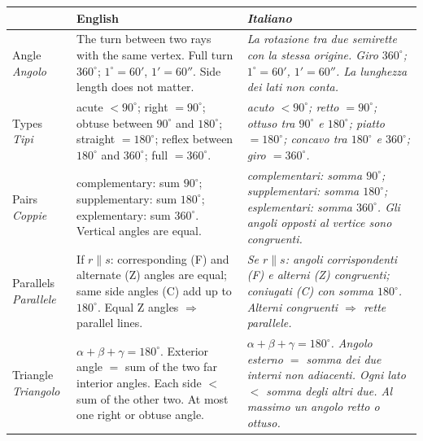 \label{app:summary}

{\small
\renewcommand{\arraystretch}{1.28}
\begin{tabularx}{\textwidth}{@{}>{\bfseries\color{navy}\raggedright\arraybackslash}p{2.1cm} >{\raggedright\arraybackslash}X >{\raggedright\arraybackslash\itshape\leavevmode\color{itgreen}}X@{}}
\toprule
\rowcolor{white}
& \textbf{English} & \textbf{\upshape Italiano}\\
\midrule
Angle \newline \textit{Angolo} &
The turn between two rays with the same vertex. Full turn $360^\circ$; $1^\circ = 60'$, $1' = 60''$. Side length does not matter. &
La rotazione tra due semirette con la stessa origine. Giro $360^\circ$; $1^\circ = 60'$, $1' = 60''$. La lunghezza dei lati non conta.\\
Types \newline \textit{Tipi} &
acute $<90^\circ$; right $=90^\circ$; obtuse between $90^\circ$ and $180^\circ$; straight $=180^\circ$; reflex between $180^\circ$ and $360^\circ$; full $=360^\circ$. &
acuto $<90^\circ$; retto $=90^\circ$; ottuso tra $90^\circ$ e $180^\circ$; piatto $=180^\circ$; concavo tra $180^\circ$ e $360^\circ$; giro $=360^\circ$.\\
Pairs \newline \textit{Coppie} &
complementary: sum $90^\circ$; supplementary: sum $180^\circ$; explementary: sum $360^\circ$. Vertical angles are equal. &
complementari: somma $90^\circ$; supplementari: somma $180^\circ$; esplementari: somma $360^\circ$. Gli angoli opposti al vertice sono congruenti.\\
Parallels \newline \textit{Parallele} &
If $r \parallel s$: corresponding (F) and alternate (Z) angles are equal; same side angles (C) add up to $180^\circ$. Equal Z angles $\Rightarrow$ parallel lines. &
Se $r \parallel s$: angoli corrispondenti (F) e alterni (Z) congruenti; coniugati (C) con somma $180^\circ$. Alterni congruenti $\Rightarrow$ rette parallele.\\
Triangle \newline \textit{Triangolo} &
$\alpha + \beta + \gamma = 180^\circ$. Exterior angle $=$ sum of the two far interior angles. Each side $<$ sum of the other two. At most one right or obtuse angle. &
$\alpha + \beta + \gamma = 180^\circ$. Angolo esterno $=$ somma dei due interni non adiacenti. Ogni lato $<$ somma degli altri due. Al massimo un angolo retto o ottuso.\\

\end{tabularx}}
